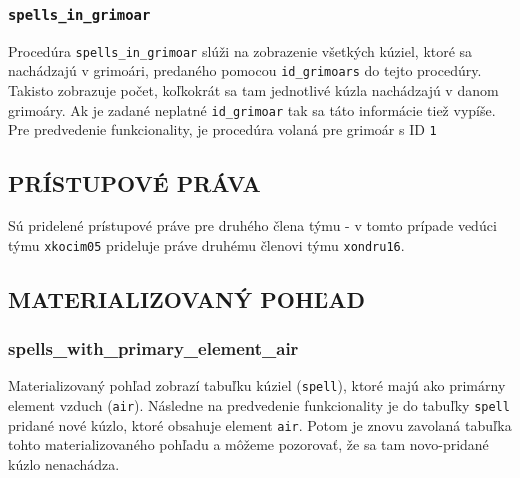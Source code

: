 \documentclass{article}
\begin{document}
\subsubsection{\texttt{spells\_in\_grimoar}}
Procedúra \texttt{spells\_in\_grimoar} slúži na zobrazenie všetkých kúziel, ktoré sa nachádzajú v grimoári, predaného pomocou \texttt{id\_grimoars} do tejto procedúry. Takisto zobrazuje počet, koľkokrát sa tam jednotlivé kúzla nachádzajú v danom grimoáry. Ak je zadané neplatné \texttt{id\_grimoar} tak sa táto informácie tiež vypíše.
Pre predvedenie funkcionality, je procedúra volaná pre grimoár s ID \texttt{1}
\subsection{PRÍSTUPOVÉ PRÁVA}
Sú pridelené prístupové práve pre druhého člena týmu - v tomto prípade vedúci týmu \texttt{xkocim05} prideluje práve druhému členovi týmu \texttt{xondru16}.
\subsection{MATERIALIZOVANÝ POHĽAD}
\subsubsection{spells\_with\_primary\_element\_air}
Materializovaný pohľad zobrazí tabuľku kúziel (\texttt{spell}), ktoré majú ako primárny element vzduch (\texttt{air}). Následne na predvedenie funkcionality je do tabuľky \texttt{spell} pridané nové kúzlo, ktoré obsahuje element \texttt{air}. Potom je znovu zavolaná tabuľka tohto materializovaného pohľadu a môžeme pozorovať, že sa tam novo-pridané kúzlo nenachádza.
\end{document}
